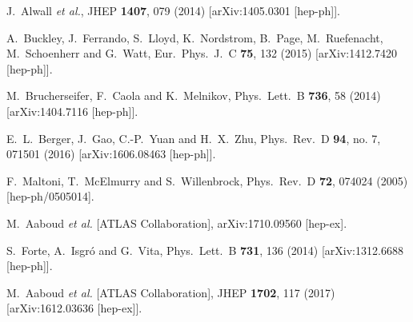 \documentclass[letter,11pt]{article}
\begin{document}
\begin{thebibliography}{99}
  J.~Alwall {\it et al.},
  JHEP {\bf 1407}, 079 (2014)
  [arXiv:1405.0301 [hep-ph]].

  A.~Buckley, J.~Ferrando, S.~Lloyd, K.~Nordstrom, B.~Page, M.~Ruefenacht, M.~Schoenherr and G.~Watt,
  Eur.\ Phys.\ J.\ C {\bf 75}, 132 (2015)
  [arXiv:1412.7420 [hep-ph]].

  M.~Brucherseifer, F.~Caola and K.~Melnikov,
  Phys.\ Lett.\ B {\bf 736}, 58 (2014)
  [arXiv:1404.7116 [hep-ph]].

  E.~L.~Berger, J.~Gao, C.-P.~Yuan and H.~X.~Zhu,
  Phys.\ Rev.\ D {\bf 94}, no. 7, 071501 (2016)
  [arXiv:1606.08463 [hep-ph]].

  F.~Maltoni, T.~McElmurry and S.~Willenbrock,
  Phys.\ Rev.\ D {\bf 72}, 074024 (2005)
  [hep-ph/0505014].

  M.~Aaboud {\it et al.} [ATLAS Collaboration],
  arXiv:1710.09560 [hep-ex].
      
  S.~Forte, A.~Isgr\'{o} and G.~Vita,
  Phys.\ Lett.\ B {\bf 731}, 136 (2014)
  [arXiv:1312.6688 [hep-ph]].

  M.~Aaboud {\it et al.} [ATLAS Collaboration],
  JHEP {\bf 1702}, 117 (2017)
  [arXiv:1612.03636 [hep-ex]].
  

\end{thebibliography}
\end{document}
